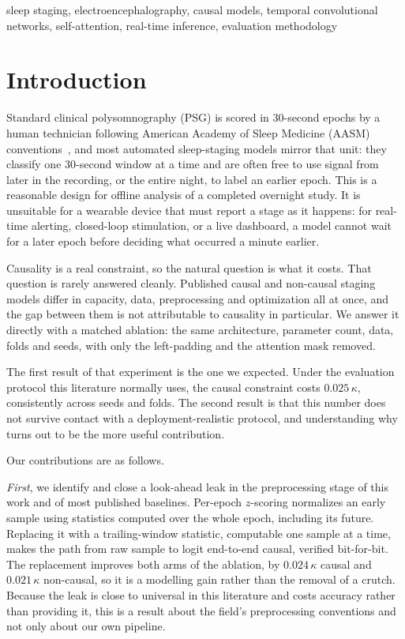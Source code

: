 \documentclass[conference]{IEEEtran}
\begin{document}
\begin{IEEEkeywords}
sleep staging, electroencephalography, causal models, temporal convolutional networks,
self-attention, real-time inference, evaluation methodology
\end{IEEEkeywords}

\section{Introduction}

Standard clinical polysomnography (PSG) is scored in 30-second epochs by a human
technician following American Academy of Sleep Medicine (AASM) conventions~\cite{aasm},
and most automated sleep-staging models mirror that unit: they classify one 30-second
window at a time and are often free to use signal from later in the recording, or the
entire night, to label an earlier epoch. This is a reasonable design for offline analysis
of a completed overnight study. It is unsuitable for a wearable device that must report a
stage as it happens: for real-time alerting, closed-loop stimulation, or a live dashboard,
a model cannot wait for a later epoch before deciding what occurred a minute earlier.

Causality is a real constraint, so the natural question is what it costs. That question
is rarely answered cleanly. Published causal and non-causal staging models differ in
capacity, data, preprocessing and optimization all at once, and the gap between them is
not attributable to causality in particular. We answer it directly with a matched
ablation: the same architecture, parameter count, data, folds and seeds, with only the
left-padding and the attention mask removed.

The first result of that experiment is the one we expected. Under the evaluation protocol
this literature normally uses, the causal constraint costs $0.025\,\kappa$, consistently
across seeds and folds. The second result is that this number does not survive contact
with a deployment-realistic protocol, and understanding why turns out to be the more
useful contribution.

Our contributions are as follows.

\emph{First}, we identify and close a look-ahead leak in the preprocessing stage of this
work and of most published baselines. Per-epoch $z$-scoring normalizes an early sample
using statistics computed over the whole epoch, including its future. Replacing it with a
trailing-window statistic, computable one sample at a time, makes the path from raw sample
to logit end-to-end causal, verified bit-for-bit. The replacement improves both arms of
the ablation, by $0.024\,\kappa$ causal and $0.021\,\kappa$ non-causal, so it is a
modelling gain rather than the removal of a crutch. Because the leak is close to universal
in this literature and costs accuracy rather than providing it, this is a result about the
field's preprocessing conventions and not only about our own pipeline.
\end{document}
